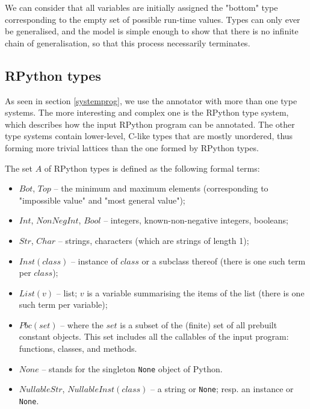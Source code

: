 \documentclass{acm_proc_article-sp}
\begin{document}
We can consider that all variables are initially assigned the "bottom"
type corresponding to the empty set of possible run-time values.  Types
can only ever be generalised, and the model is simple enough to show
that there is no infinite chain of generalisation, so that this process
necessarily terminates.


\subsection{RPython types}

As seen in section \ref{systemprog}, we use the annotator with more than one type
systems.  The more interesting and complex one is the RPython type
system, which describes how the input RPython program can be annotated.
The other type systems contain lower-level, C-like types that are mostly
unordered, thus forming more trivial lattices than the one formed by
RPython types.

The set $A$ of RPython types is defined as the following formal terms:

\begin{itemize}
\item $Bot$, $Top$ -- the minimum and maximum elements (corresponding
      to "impossible value" and "most general value");

\item $Int$, $NonNegInt$, $Bool$ -- integers, known-non-negative
      integers, booleans;

\item $Str$, $Char$ -- strings, characters (which are strings of
      length 1);

\item $Inst(class)$ -- instance of $class$ or a subclass thereof
      (there is one such term per $class$);

\item $List(v)$ -- list; $v$ is a variable summarising the items of
      the list (there is one such term per variable);

\item $Pbc(set)$ -- where the $set$ is a subset of the (finite) set of
      all prebuilt constant objects.  This set includes all the
      callables of the input program: functions, classes, and methods.

\item $None$ -- stands for the singleton \texttt{None} object of
      Python.

\item $NullableStr$, $NullableInst(class)$ -- a string or
      \texttt{None}; resp. an instance or \texttt{None}.
\end{itemize}
      
\end{document}
